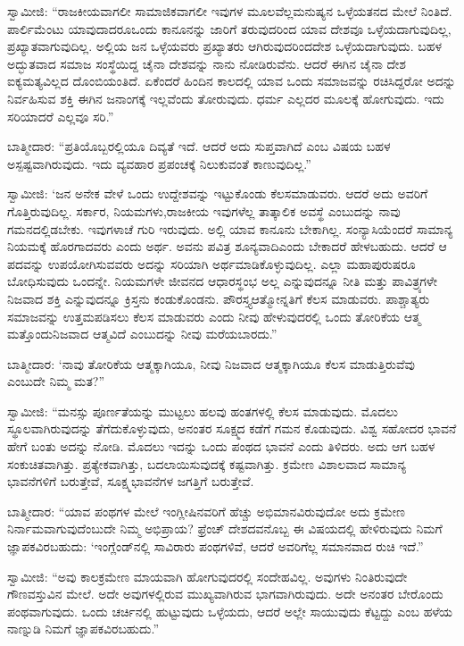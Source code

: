ಸ್ವಾಮೀಜಿ: “ರಾಜಕೀಯವಾಗಲೀ ಸಾಮಾಜಿಕವಾಗಲೀ ಇವುಗಳ ಮೂಲವೆಲ್ಲ\break ಮನುಷ್ಯನ ಒಳ್ಳೆಯತನದ ಮೇಲೆ ನಿಂತಿದೆ. ಪಾರ್ಲಿಮೆಂಟು ಯಾವುದಾದರೂ\break ಒಂದು ಕಾನೂನನ್ನು ಜಾರಿಗೆ ತರುವುದರಿಂದ ಯಾವ ದೇಶವೂ ಒಳ್ಳೆಯದಾಗುವುದಿಲ್ಲ, ಪ್ರಖ್ಯಾತವಾಗುವುದಿಲ್ಲ. ಅಲ್ಲಿಯ ಜನ ಒಳ್ಳೆಯವರು ಪ್ರಖ್ಯಾತರು ಆಗಿರುವುದರಿಂದ\break ದೇಶ ಒಳ್ಳೆಯದಾಗುವುದು. ಬಹಳ ಅದ್ಭುತವಾದ ಸಮಾಜ ಸಂಸ್ಥೆಯಿದ್ದ ಚೈನಾ ದೇಶವನ್ನು ನಾನು ನೋಡಿರುವೆನು. ಆದರೆ ಈಗಿನ ಚೈನಾ ದೇಶ ಐಕ್ಯಮತ್ಯವಿಲ್ಲದ ದೊಂಬಿಯಂತಿದೆ. ಏಕೆಂದರೆ ಹಿಂದಿನ ಕಾಲದಲ್ಲಿ ಯಾವ ಒಂದು ಸಮಾಜವನ್ನು ರಚಿಸಿದ್ದರೋ ಅದನ್ನು ನಿರ್ವಹಿಸುವ ಶಕ್ತಿ ಈಗಿನ ಜನಾಂಗಕ್ಕೆ ಇಲ್ಲವೆಂದು ತೋರುವುದು. ಧರ್ಮ ಎಲ್ಲದರ ಮೂಲಕ್ಕೆ ಹೋಗುವುದು. ಇದು ಸರಿಯಾದರೆ ಎಲ್ಲವೂ ಸರಿ.”

ಬಾತ್ಮೀದಾರ: “ಪ್ರತಿಯೊಬ್ಬರಲ್ಲಿಯೂ ದಿವ್ಯತೆ ಇದೆ. ಆದರೆ ಅದು ಸುಪ್ತವಾಗಿದೆ ಎಂಬ ವಿಷಯ ಬಹಳ ಅಸ್ಪಷ್ಟವಾಗಿರುವುದು. ಇದು ವ್ಯವಹಾರ ಪ್ರಪಂಚಕ್ಕೆ ನಿಲುಕುವಂತೆ ಕಾಣುವುದಿಲ್ಲ.”

ಸ್ವಾಮೀಜಿ: ‘ಜನ ಅನೇಕ ವೇಳೆ ಒಂದು ಉದ್ದೇಶವನ್ನು ಇಟ್ಟುಕೊಂಡು ಕೆಲಸ\break ಮಾಡುವರು. ಆದರೆ ಅದು ಅವರಿಗೆ ಗೊತ್ತಿರುವುದಿಲ್ಲ. ಸರ್ಕಾರ, ನಿಯಮಗಳು,\break ರಾಜಕೀಯ ಇವುಗಳೆಲ್ಲ ತಾತ್ಕಾಲಿಕ ಅವಸ್ಥೆ ಎಂಬುದನ್ನು ನಾವು ಗಮನದಲ್ಲಿಡಬೇಕು. ಇವುಗಳಾಚೆ ಗುರಿ ಇರುವುದು. ಅಲ್ಲಿ ಯಾವ ಕಾನೂನು ಬೇಕಾಗಿಲ್ಲ. ಸಂನ್ಯಾಸಿಯೆಂದರೆ ಸಾಮಾನ್ಯ ನಿಯಮಕ್ಕೆ ಹೊರಗಾದವರು ಎಂದು ಅರ್ಥ. ಅವನು ಪವಿತ್ರ ಶೂನ್ಯವಾದಿ\break ಎಂದು ಬೇಕಾದರೆ ಹೇಳಬಹುದು. ಆದರೆ ಆ ಪದವನ್ನು ಉಪಯೋಗಿಸುವವರು ಅದನ್ನು ಸರಿಯಾಗಿ ಅರ್ಥಮಾಡಿಕೊಳ್ಳುವುದಿಲ್ಲ. ಎಲ್ಲಾ ಮಹಾಪುರುಷರೂ ಬೋಧಿಸುವುದು ಒಂದನ್ನೇ. ನಿಯಮಗಳೇ ಜೀವನದ ಆಧಾರಸ್ಥಂಭ ಅಲ್ಲ ಎನ್ನುವುದನ್ನೂ ನೀತಿ ಮತ್ತು ಪಾವಿತ್ರ್ಯಗಳೇ ನಿಜವಾದ ಶಕ್ತಿ ಎನ್ನುವುದನ್ನೂ ಕ್ರಿಸ್ತನು ಕಂಡುಕೊಂಡನು. ಪೌರಸ್ತ್ಯ\break ಆತ್ಮೋನ್ನತಿಗೆ ಕೆಲಸ ಮಾಡುವರು. ಪಾಶ್ಚಾತ್ಯರು ಸಮಾಜವನ್ನು ಉತ್ತಮಪಡಿಸಲು ಕೆಲಸ ಮಾಡುವರು ಎಂದು ನೀವು ಹೇಳುವುದರಲ್ಲಿ ಒಂದು ತೋರಿಕೆಯ ಆತ್ಮ ಮತ್ತೊಂದು\break ನಿಜವಾದ ಆತ್ಮವಿದೆ ಎಂಬುದನ್ನು ನೀವು ಮರೆಯಬಾರದು.”

ಬಾತ್ಮೀದಾರ: ‘ನಾವು ತೋರಿಕೆಯ ಆತ್ಮಕ್ಕಾಗಿಯೂ, ನೀವು ನಿಜವಾದ ಆತ್ಮಕ್ಕಾಗಿಯೂ ಕೆಲಸ ಮಾಡುತ್ತಿರುವೆವು ಎಂಬುದೇ ನಿಮ್ಮ ಮತ?”

\eject

ಸ್ವಾಮೀಜಿ: “ಮನಸ್ಸು ಪೂರ್ಣತೆಯನ್ನು ಮುಟ್ಟಲು ಹಲವು ಹಂತಗಳಲ್ಲಿ ಕೆಲಸ ಮಾಡುವುದು. ಮೊದಲು ಸ್ಥೂಲವಾಗಿರುವುದನ್ನು ತೆಗೆದುಕೊಳ್ಳುವುದು, ಅನಂತರ ಸೂಕ್ಷ್ಮದ ಕಡೆಗೆ ಗಮನ ಕೊಡುವುದು. ವಿಶ್ವ ಸಹೋದರ ಭಾವನೆ ಹೇಗೆ ಬಂತು ಅದನ್ನು ನೋಡಿ. ಮೊದಲು ಇದನ್ನು ಒಂದು ಪಂಥದ ಭಾವನೆ ಎಂದು ತಿಳಿದರು. ಅದು ಆಗ ಬಹಳ ಸಂಕುಚಿತವಾಗಿತ್ತು. ಪ್ರತ್ಯೇಕವಾಗಿತ್ತು, ಬದಲಾಯಿಸುವುದಕ್ಕೆ ಕಷ್ಟವಾಗಿತ್ತು. ಕ್ರಮೇಣ ವಿಶಾಲವಾದ ಸಾಮಾನ್ಯ ಭಾವನೆಗಳಿಗೆ ಬರುತ್ತೇವೆ, ಸೂಕ್ಷ್ಮಭಾವನೆಗಳ ಜಗತ್ತಿಗೆ ಬರುತ್ತೇವೆ.

\vskip 4pt

ಬಾತ್ಮೀದಾರ: “ಯಾವ ಪಂಥಗಳ ಮೇಲೆ ಇಂಗ್ಲೀಷಿನವರಿಗೆ ಹೆಚ್ಚು ಅಭಿಮಾನ\-ವಿರುವುದೋ ಅದು ಕ್ರಮೇಣ ನಿರ್ನಾಮವಾಗುವುದೆಂಬುದೇ ನಿಮ್ಮ ಅಭಿಪ್ರಾಯ? ಫ್ರೆಂಚ್​ ದೇಶದವನೊಬ್ಬ ಈ ವಿಷಯದಲ್ಲಿ ಹೇಳಿರುವುದು ನಿಮಗೆ ಜ್ಞಾಪಕವಿರ\break ಬಹುದು: ‘ಇಂಗ್ಲೆಂಡ್​ನಲ್ಲಿ ಸಾವಿರಾರು ಪಂಥಗಳಿವೆ, ಆದರೆ ಅವರಿಗೆಲ್ಲ ಸಮಾನವಾದ ರುಚಿ ಇದೆ.”

\vskip 4pt

ಸ್ವಾಮೀಜಿ: “ಅವು ಕಾಲಕ್ರಮೇಣ ಮಾಯವಾಗಿ ಹೋಗುವುದರಲ್ಲಿ ಸಂದೇಹವಿಲ್ಲ. ಅವುಗಳು ನಿಂತಿರುವುದೇ ಗೌಣವಸ್ತುವಿನ ಮೇಲೆ. ಅದೇ ಅವುಗಳಲ್ಲಿರುವ ಮುಖ್ಯವಾಗಿ\-ರುವ ಭಾಗವಾಗಿರುವುದು. ಅದೇ ಅನಂತರ ಬೇರೊಂದು ಪಂಥವಾಗುವುದು. ಒಂದು ಚರ್ಚಿನಲ್ಲಿ ಹುಟ್ಟುವುದು ಒಳ್ಳೆಯದು, ಆದರೆ ಅಲ್ಲೇ ಸಾಯುವುದು ಕೆಟ್ಟದ್ದು ಎಂಬ ಹಳೆಯ ನಾಣ್ನುಡಿ ನಿಮಗೆ ಜ್ಞಾಪಕವಿರಬಹುದು.”

